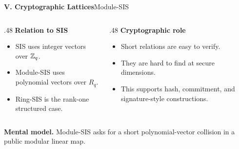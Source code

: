 \begin{frame}[shrink=8]{\textbf{V. Cryptographic Lattices}}{Module-SIS}
\begin{columns}[T,onlytextwidth]
\begin{column}{.48\textwidth}
\textcolor{TealDarkCyan}{\textbf{Relation to SIS}}
\begin{itemize}
  \item SIS uses integer vectors over $\mathbb{Z}_q$.
  \item Module-SIS uses polynomial vectors over $R_q$.
  \item Ring-SIS is the rank-one structured case.
\end{itemize}
\end{column}
\begin{column}{.48\textwidth}
\textcolor{TealDarkCyan}{\textbf{Cryptographic role}}
\begin{itemize}
  \item Short relations are easy to verify.
  \item They are hard to find at secure dimensions.
  \item This supports hash, commitment, and signature-style constructions.
\end{itemize}
\end{column}
\end{columns}
\textbf{Mental model.}\; Module-SIS asks for a short polynomial-vector collision in a public modular linear map.
\end{frame}

